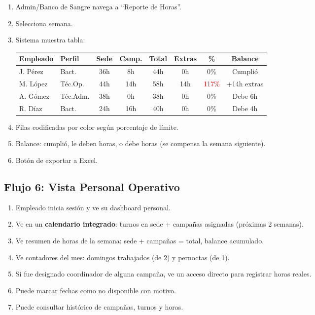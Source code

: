 \documentclass[10pt,a4paper]{article}
\begin{document}
\begin{enumerate}[leftmargin=2em]
    \item Admin/Banco de Sangre navega a ``Reporte de Horas''.
    \item Selecciona semana.
    \item Sistema muestra tabla:

    \small
    \begin{tabularx}{\textwidth}{|l|l|c|c|c|c|c|c|}
    \hline
    \textbf{Empleado} & \textbf{Perfil} & \textbf{Sede} & \textbf{Camp.} & \textbf{Total} & \textbf{Extras} & \textbf{\%} & \textbf{Balance} \\
    \hline
    J. P\'{e}rez & Bact. & 36h & 8h & 44h & 0h & 0\% & Cumpli\'{o} \\
    \hline
    M. L\'{o}pez & T\'{e}c.Op. & 44h & 14h & 58h & 14h & \textcolor{red}{117\%} & +14h extras \\
    \hline
    A. G\'{o}mez & T\'{e}c.Adm. & 38h & 0h & 38h & 0h & 0\% & Debe 6h \\
    \hline
    R. D\'{i}az & Bact. & 24h & 16h & 40h & 0h & 0\% & Debe 4h \\
    \hline
    \end{tabularx}
    \normalsize

    \item Filas codificadas por color seg\'{u}n porcentaje de l\'{i}mite.
    \item Balance: cumpli\'{o}, le deben horas, o debe horas (se compensa la semana siguiente).
    \item Bot\'{o}n de exportar a Excel.
\end{enumerate}

\subsection{Flujo 6: Vista Personal Operativo}

\begin{enumerate}[leftmargin=2em]
    \item Empleado inicia sesi\'{o}n y ve su dashboard personal.
    \item Ve en un \textbf{calendario integrado}: turnos en sede + campañas asignadas (pr\'{o}ximas 2 semanas).
    \item Ve resumen de horas de la semana: sede + campañas = total, balance acumulado.
    \item Ve contadores del mes: domingos trabajados (de 2) y pernoctas (de 1).
    \item Si fue designado coordinador de alguna campaña, ve un acceso directo para registrar horas reales.
    \item Puede marcar fechas como no disponible con motivo.
    \item Puede consultar hist\'{o}rico de campañas, turnos y horas.
\end{enumerate}
\end{document}

